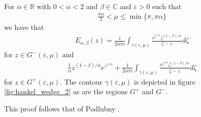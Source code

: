 \begin{lemma}
    \label{lem:mit_lef_contour_1}
    For $ \alpha \in \mathbb{R} $ with $ 0 < \alpha < 2 $ and $ \beta \in \mathbb{C} $ and $ \varepsilon > 0 $
    such that
    \begin{align}
        \label{eq:mit_lef_region}
	    \frac{\pi \alpha}{2} < \mu \leq \min\{ \pi, \pi \alpha \}
    \end{align}
    we have that
    \begin{align}
	    \label{eq:mit_lef_contour_1}
        E_{\alpha, \beta}(z) = \frac{1}{2\alpha\pi i} \int_{\gamma(\varepsilon, \mu)} \frac{e^{\zeta^{1 / \alpha}}\zeta^{(1-\beta)/\alpha}}{\zeta - z} d\zeta
    \end{align}
    for $ z \in G^{-}(\varepsilon, \mu) $
    and
    \begin{align}
    \label{eq:mit_lef_contour_2}
	\frac{1}{\alpha} z^{(1-\beta) / \alpha} e^{z^{1 / \alpha}} + \frac{1}{2\alpha\pi i} \int_{\gamma(\varepsilon, \mu)} \frac{e^{\zeta^{1 / \alpha}}\zeta^{(1-\beta)/\alpha}}{\zeta - z} d\zeta
    \end{align}
    for $ z \in G^{+}(\varepsilon, \mu) $.
    The contour $ \gamma(\varepsilon, \mu) $ is depicted in figure \ref{fig:hankel_wedge_2} as are the regions $ G^+ $ and $ G^-$.
\end{lemma}
This proof follows that of Podlubny \cite{Podlubny1999}.
